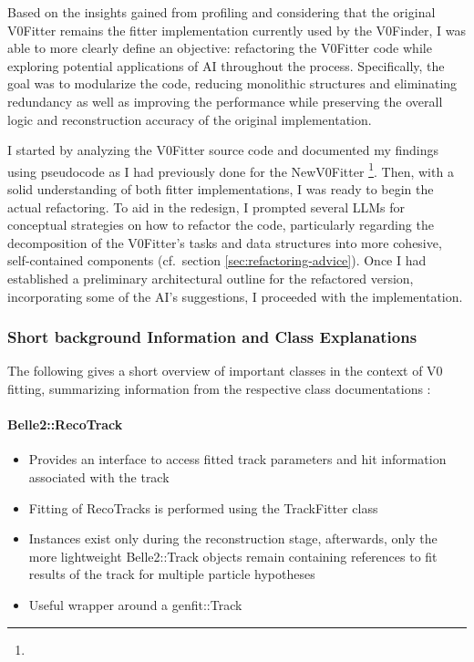 Based on the insights gained from profiling and considering that the original V0Fitter remains the fitter implementation currently used by the V0Finder, I was able to more clearly define an objective: refactoring the V0Fitter code while exploring potential applications of AI throughout the process.
Specifically, the goal was to modularize the code, reducing monolithic structures and eliminating redundancy as well as improving the performance while preserving the overall logic and reconstruction accuracy of the original implementation.

I started by analyzing the V0Fitter source code and documented my findings using pseudocode as I had previously done for the NewV0Fitter%
\footnote{%
}.
Then, with a solid understanding of both fitter implementations, I was ready to begin the actual refactoring.
To aid in the redesign, I prompted several LLMs for conceptual strategies on how to refactor the code, particularly regarding the decomposition of the V0Fitter's tasks and data structures into more cohesive, self-contained components (cf.\ section \ref{sec:refactoring-advice}).
Once I had established a preliminary architectural outline for the refactored version, incorporating some of the AI's suggestions, I proceeded with the implementation.

\subsubsection{Short background Information and Class Explanations}
The following gives a short overview of important classes in the context of V0 fitting, summarizing information from the respective class documentations %
\cite{recotrack-doxygen}%
\cite{b2track-doxygen}%
\cite{recogfaccess-doxygen}%
\cite{b2v0-doxygen}%
:

\paragraph{Belle2::RecoTrack}
\begin{itemize}[topsep=0pt]
  \item Provides an interface to access fitted track parameters and hit information associated with the track
  \item Fitting of RecoTracks is performed using the TrackFitter class
  \item Instances exist only during the reconstruction stage, afterwards, only the more lightweight Belle2::Track objects remain containing references to fit results of the track for multiple particle hypotheses
  \item Useful wrapper around a genfit::Track
\end{itemize}

